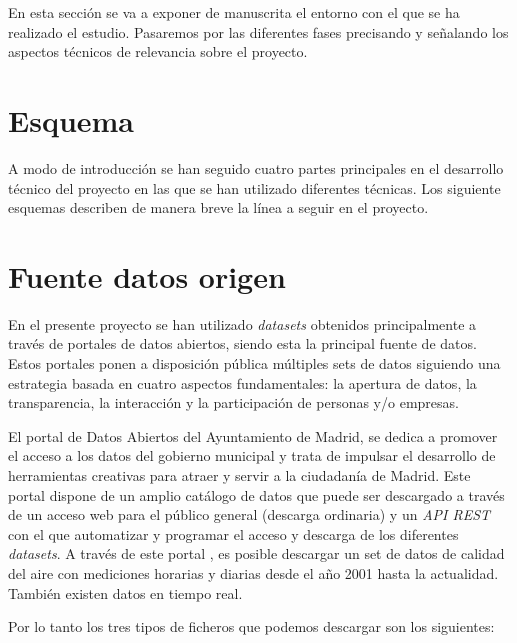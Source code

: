 
En esta sección se va a exponer de manuscrita el entorno con el que se ha realizado el estudio. Pasaremos por las diferentes fases precisando y señalando los aspectos técnicos de relevancia sobre el proyecto.


\section{Esquema}

A modo de introducción se han seguido cuatro partes principales en el desarrollo técnico del proyecto en las que se han utilizado diferentes técnicas. Los siguiente esquemas describen de manera breve la línea a seguir en el proyecto.


\section{Fuente datos origen}

En el presente proyecto se han utilizado \textit{datasets} obtenidos principalmente a través de portales de datos abiertos, siendo esta la principal fuente de datos. Estos portales ponen a disposición pública múltiples sets de datos siguiendo una estrategia basada en cuatro aspectos fundamentales: la apertura de datos, la transparencia, la interacción y la participación de personas y/o empresas. 

El portal de Datos Abiertos del Ayuntamiento de Madrid, se dedica a promover el acceso a los datos del gobierno municipal y trata de impulsar el desarrollo de herramientas creativas para atraer y servir a la ciudadanía de Madrid. 
Este portal dispone de un amplio catálogo de datos que puede ser descargado a través de un acceso web para el público general (descarga ordinaria) y un \textit{API REST} con el que automatizar y programar el acceso y descarga de los diferentes \textit{datasets}. A través de este portal \cite{portal_datosabiertos_madrid}, es posible descargar un set de datos de calidad del aire con mediciones horarias y diarias desde el año 2001 hasta la actualidad. También existen datos en tiempo real.

Por lo tanto los tres tipos de ficheros que podemos descargar son los siguientes:


